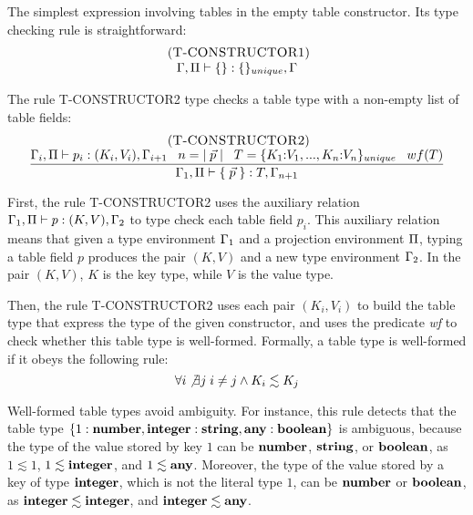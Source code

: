 The simplest expression involving tables in the empty table constructor.
Its type checking rule is straightforward:
\[
\begin{array}{c}
\; (\textsc{T-CONSTRUCTOR1})\\
\Gamma, \Pi \vdash \{\}:\{\}_{unique}, \Gamma
\end{array}
\]

The rule \textsc{T-CONSTRUCTOR2} type checks a table type with a non-empty
list of table fields:
\[
\begin{array}{c}
\; (\textsc{T-CONSTRUCTOR2})\\
\dfrac{\Gamma_{i}, \Pi \vdash p_{i}:(K_{i},V_{i}), \Gamma_{i+1} \;\;\;
       n = |\;\vec{p}\;| \;\;\;
       T = \{K_{1}{:}V_{1}, ..., K_{n}{:}V_{n}\}_{unique} \;\;\;
       wf(T)}
      {\Gamma_{1}, \Pi \vdash \{\;\vec{p}\;\}:T, \Gamma_{n+1}}
\end{array}
\]

First, the rule \textsc{T-CONSTRUCTOR2} uses the auxiliary relation
$\Gamma_{1}, \Pi \vdash p : (K,V), \Gamma_{2}$ to type check each table
field $p_{i}$.
This auxiliary relation means that given a type environment $\Gamma_{1}$
and a projection environment $\Pi$, typing a table field $p$
produces the pair $(K,V)$ and a new type environment $\Gamma_{2}$. 
In the pair $(K,V)$, $K$ is the key type, while $V$ is the value type.

Then, the rule \textsc{T-CONSTRUCTOR2} uses each pair $(K_{i},V_{i})$
to build the table type that express the type of the given constructor, and
uses the predicate \emph{wf} to check whether this table type is well-formed.
Formally, a table type is well-formed if it obeys the following rule:
\[
\forall i \not\exists j \; i \not= j \wedge K_{i} \lesssim K_{j}
\]

Well-formed table types avoid ambiguity.
For instance, this rule detects that the table type
$\{1:\mathbf{number}, \mathbf{integer}:\mathbf{string}, \mathbf{any}:\mathbf{boolean}\}$ is ambiguous,
because the type of the value stored by key $1$ can be
$\mathbf{number}$, $\mathbf{string}$, or $\mathbf{boolean}$, as $1 \lesssim 1$,
$1 \lesssim \mathbf{integer}$, and $1 \lesssim \mathbf{any}$.
Moreover, the type of the value stored by a key of type $\mathbf{integer}$,
which is not the literal type $1$, can be $\mathbf{number}$ or $\mathbf{boolean}$,
as $\mathbf{integer} \lesssim \mathbf{integer}$, and $\mathbf{integer} \lesssim \mathbf{any}$.

